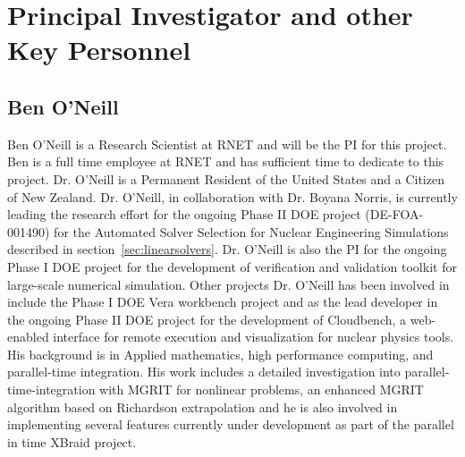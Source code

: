 \section{Principal Investigator and other Key Personnel}

\subsection{Ben O'Neill}
Ben O'Neill is a Research Scientist at RNET and will be the PI for this project. Ben is a full time employee at
RNET and has sufficient time to dedicate to this project. Dr. O'Neill is a Permanent Resident of the United States 
and a Citizen of New Zealand. Dr. O'Neill, in collaboration with Dr. Boyana Norris, is currently leading the research effort for the  
ongoing Phase II DOE project (DE-FOA-001490) for the Automated Solver Selection for Nuclear Engineering 
Simulations described in section~\ref{sec:linearsolvers}. Dr. O'Neill is also the PI for the ongoing Phase I DOE project for 
the development of verification and validation toolkit for large-scale numerical simulation. Other projects Dr. O'Neill
has been involved in include the Phase I DOE Vera workbench project and as the lead developer in the ongoing Phase II 
DOE project for the development of Cloudbench, a web-enabled interface for remote execution and visualization for nuclear 
physics tools. His background is in Applied mathematics, high performance computing,
and parallel-time integration. His work includes a detailed investigation into parallel-time-integration
with MGRIT for nonlinear problems, an enhanced MGRIT algorithm based on Richardson extrapolation and he is also
involved in implementing several features currently under development as part of the parallel in time XBraid project.

